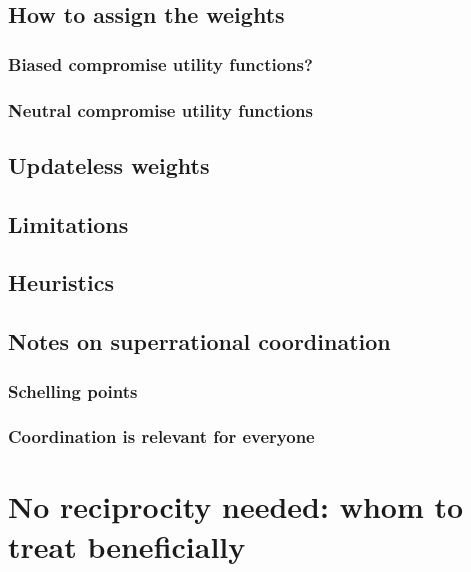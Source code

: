 \documentclass{book}
\begin{document}
\subsection{How to assign the weights}
\label{How to assign the weights}

\subsubsection{Biased compromise utility functions?}
\label{Biased compromise utility functions?}

\subsubsection{Neutral compromise utility functions}
\label{Neutral compromise utility functions}

\subsection{Updateless weights}
\label{Updateless weights}

\subsection{Limitations}
\label{Limitations}

\subsection{Heuristics}
\label{Heuristics}

\subsection{Notes on superrational coordination}
\label{Notes on superrational coordination}

\subsubsection{Schelling points}
\label{Schelling points}

\subsubsection{Coordination is relevant for everyone}
\label{Coordination is relevant for everyone}

\section{No reciprocity needed: whom to treat beneficially}
\label{No reciprocity needed: whom to treat beneficially}
\end{document}
